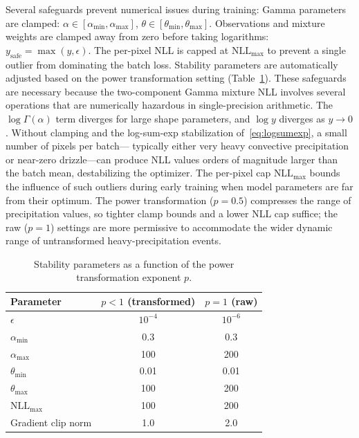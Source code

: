 \documentclass[11pt]{article}
\begin{document}
Several safeguards prevent numerical issues during training:
Gamma parameters are clamped: $\alpha \in [\alpha_{\min},
\alpha_{\max}]$, $\theta \in [\theta_{\min}, \theta_{\max}]$.
Observations and mixture weights are clamped away from
zero before taking logarithms: $y_{\text{safe}} = \max(y, \epsilon)$.
The per-pixel NLL is capped at $\text{NLL}_{\max}$ to
prevent a single outlier from dominating the batch loss.
Stability parameters are automatically adjusted based on
the power transformation setting (Table~\ref{tab:stability}).
These safeguards are necessary because the two-component Gamma
mixture NLL involves several operations that are numerically
hazardous in single-precision arithmetic.  The $\log\Gamma(\alpha)$
term diverges for large shape parameters, and $\log y$ diverges
as $y\to 0$.  Without clamping and the log-sum-exp stabilization
of~\eqref{eq:logsumexp}, a small number of pixels per batch---
typically either very heavy convective precipitation or near-zero
drizzle---can produce NLL values orders of magnitude larger than
the batch mean, destabilizing the optimizer.  The per-pixel cap
$\text{NLL}_{\max}$ bounds the influence of such outliers during
early training when model parameters are far from their optimum.
The power transformation ($p=0.5$) compresses the range of
precipitation values, so tighter clamp bounds and a lower NLL cap
suffice; the raw ($p=1$) settings are more permissive to accommodate
the wider dynamic range of untransformed heavy-precipitation events.

\begin{table}[ht]
\centering
\caption{Stability parameters as a function of the power
  transformation exponent $p$.}
\label{tab:stability}
\begin{tabular}{lcc}
\toprule
Parameter & $p < 1$ (transformed) & $p = 1$ (raw) \\
\midrule
$\epsilon$ & $10^{-4}$ & $10^{-6}$ \\
$\alpha_{\min}$ & 0.3 & 0.3 \\
$\alpha_{\max}$ & 100 & 200 \\
$\theta_{\min}$ & 0.01 & 0.01 \\
$\theta_{\max}$ & 100 & 200 \\
$\text{NLL}_{\max}$ & 100 & 200 \\
Gradient clip norm & 1.0 & 2.0 \\
\bottomrule
\end{tabular}
\end{table}

\end{document}
